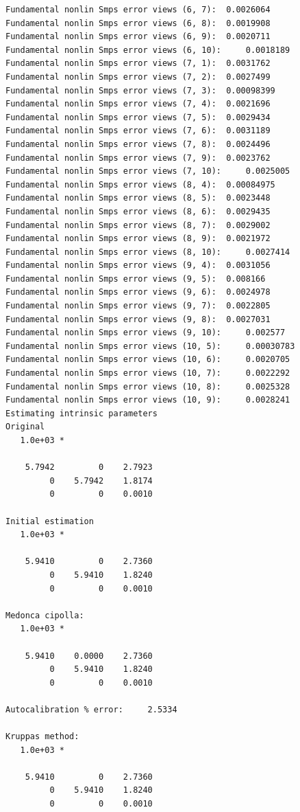 \documentclass[12pt]{article}
\begin{document}
\begin{verbatim}
Fundamental nonlin Smps error views (6, 7):	 0.0026064 
Fundamental nonlin Smps error views (6, 8):	 0.0019908 
Fundamental nonlin Smps error views (6, 9):	 0.0020711 
Fundamental nonlin Smps error views (6, 10):	 0.0018189 
Fundamental nonlin Smps error views (7, 1):	 0.0031762 
Fundamental nonlin Smps error views (7, 2):	 0.0027499 
Fundamental nonlin Smps error views (7, 3):	 0.00098399 
Fundamental nonlin Smps error views (7, 4):	 0.0021696 
Fundamental nonlin Smps error views (7, 5):	 0.0029434 
Fundamental nonlin Smps error views (7, 6):	 0.0031189 
Fundamental nonlin Smps error views (7, 8):	 0.0024496 
Fundamental nonlin Smps error views (7, 9):	 0.0023762 
Fundamental nonlin Smps error views (7, 10):	 0.0025005 
Fundamental nonlin Smps error views (8, 4):	 0.00084975 
Fundamental nonlin Smps error views (8, 5):	 0.0023448 
Fundamental nonlin Smps error views (8, 6):	 0.0029435 
Fundamental nonlin Smps error views (8, 7):	 0.0029002 
Fundamental nonlin Smps error views (8, 9):	 0.0021972 
Fundamental nonlin Smps error views (8, 10):	 0.0027414 
Fundamental nonlin Smps error views (9, 4):	 0.0031056 
Fundamental nonlin Smps error views (9, 5):	 0.008166 
Fundamental nonlin Smps error views (9, 6):	 0.0024978 
Fundamental nonlin Smps error views (9, 7):	 0.0022805 
Fundamental nonlin Smps error views (9, 8):	 0.0027031 
Fundamental nonlin Smps error views (9, 10):	 0.002577 
Fundamental nonlin Smps error views (10, 5):	 0.00030783 
Fundamental nonlin Smps error views (10, 6):	 0.0020705 
Fundamental nonlin Smps error views (10, 7):	 0.0022292 
Fundamental nonlin Smps error views (10, 8):	 0.0025328 
Fundamental nonlin Smps error views (10, 9):	 0.0028241 
Estimating intrinsic parameters
Original
   1.0e+03 *

    5.7942         0    2.7923
         0    5.7942    1.8174
         0         0    0.0010

Initial estimation
   1.0e+03 *

    5.9410         0    2.7360
         0    5.9410    1.8240
         0         0    0.0010

Medonca cipolla: 
   1.0e+03 *

    5.9410    0.0000    2.7360
         0    5.9410    1.8240
         0         0    0.0010

Autocalibration % error:	 2.5334 

Kruppas method: 
   1.0e+03 *

    5.9410         0    2.7360
         0    5.9410    1.8240
         0         0    0.0010


\end{verbatim}
\end{document}
